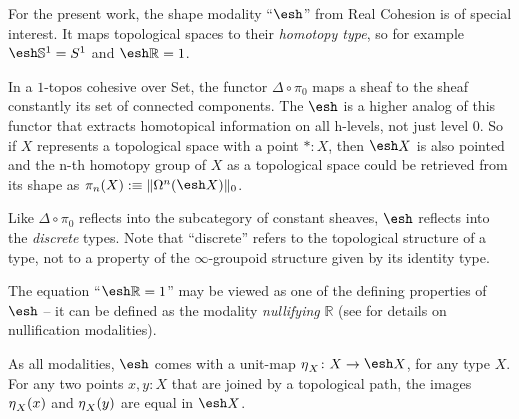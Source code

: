 \documentclass[9pt,twosided]{amsart}
\newcommand{\shape}{\ensuremath{\mathord{\raisebox{0.5pt}{\text{\rm\esh}}}}}
\newcommand{\bR}{\mathbb R}
\newcommand{\bS}{\mathbb S}
\begin{document}
For the present work, the shape modality ``$\shape$'' from Real Cohesion is of special interest.
It maps topological spaces to their \emph{homotopy type}, so for example $\shape \bS^{1} =\sphere{1}$ 
and $\shape \bR =1$.

In a $1$-topos cohesive over Set, the functor $\Delta\circ\pi_0$ maps a sheaf to the sheaf constantly its set of connected components.
The $\shape$ is a higher analog of this functor that extracts homotopical information on all h-levels, not just level 0.
So if $X$ represents a topological space with a point $\ast: X$, 
then $\shape X$ is also pointed and the n-th homotopy group of $X$ as a topological space 
could be retrieved from its shape 
as $\pi_n(X):\equiv\trunc{0}{\Omega^n(\shape X)}$.

Like $\Delta\circ\pi_0$ reflects into the subcategory of constant sheaves, $\shape$ reflects into the \emph{discrete} types.
Note that ``discrete'' refers to the topological structure of a type, 
not to a property of the $\infty$-groupoid structure given by its identity type.

The equation ``$\shape \bR=1$'' may be viewed as one of the defining properties of $\shape$
-- it can be defined as the modality \emph{nullifying} $\bR$ (see \cite[Section 2.3]{RijkeSpittersShulman} for details on nullification modalities).

As all modalities, $\shape$ comes with a unit-map $\modalunit_X\colon X \to \shape X$, for any type $X$.
For any two points $x,y: X$ that are joined by a topological path, 
the images ${\eta_{}}_X(x)$ and ${\eta_{}}_X(y)$ are equal in $\shape X$.
\end{document}
